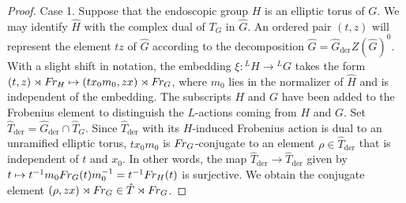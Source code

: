 \documentclass{amsart}
\newcommand\FrG{\text{$F\hskip-.1em r_G$}}
\newcommand\FrH{\text{$F\hskip-.1em r_H$}}
\newcommand\der{{\text{der}}}
\begin{document}
\begin{proof}
Case 1.  Suppose that the endoscopic group $H$
is an elliptic torus of $G$.  We may identify $\hat H$ with 
the complex dual of $T_G$ in $\hat G$.
An ordered pair $(t,z)$ will
represent the element $tz$ of $\hat G$ 
according to the decomposition $\hat G =\hat G_\der Z(\hat G)^0$.
With a slight shift in notation,
the embedding
$\xi:{}^L\!H\to{}^L\!G$ takes the form $(t,z)\rtimes\FrH\mapsto (tx_0m_0,zx)\rtimes \FrG$,
where $m_0$ lies in the normalizer of $\hat H$ 
and is independent of the embedding.
The subscripts $H$ and $G$ have been added to the Frobenius element to
distinguish the $L$-actions coming from $H$ and $G$.  
Set $\hat T_\der=\hat G_\der\cap \hat T_G$.
Since $\hat T_\der$ with its $H$-induced Frobenius action
is dual to an unramified elliptic torus, 
$tx_0m_0$ is $\FrG$-conjugate to an element $\rho\in\hat T_\der$
that is independent of $t$ and $x_0$.  In other words, 
the map $\hat T_\der \to
\hat T_\der$ given by $t\mapsto t^{-1}m_0\FrG(t)m_0^{-1}
= t^{-1}\FrH(t)$ is surjective.
We obtain the conjugate element $(\rho,zx)\rtimes\FrG\in \hat T\rtimes\FrG$.


\end{proof}
\end{document}
